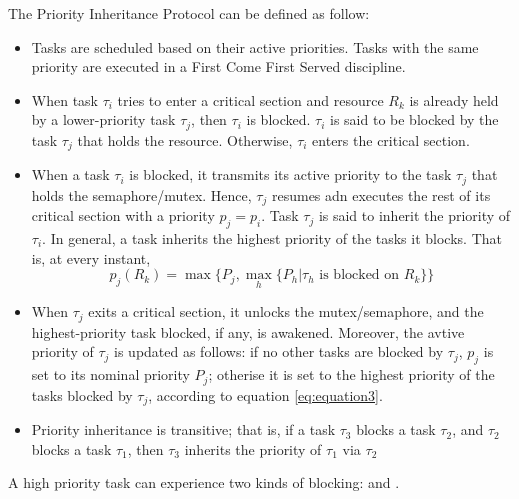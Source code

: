 The Priority Inheritance Protocol can be defined as follow:
\begin{itemize}
    \item Tasks are scheduled based on their active priorities. Tasks with the same priority are executed in a First Come First Served discipline.
    \item When task $\tau_i$ tries to enter a critical section and resource $R_k$ is already held by a lower-priority task $\tau_j$, then $\tau_i$ is blocked. $\tau_i$ is said to be blocked by the task $\tau_j$ that holds the resource. Otherwise, $\tau_i$ enters the critical section.
    \item When a task $\tau_i$ is blocked, it transmits its active priority to the task $\tau_j$ that holds the semaphore/mutex. Hence, $\tau_j$ resumes adn executes the rest of its critical section with a priority $p_j = p_i$. Task $\tau_j$ is said to inherit the priority of $\tau_i$. In general, a task inherits the highest priority of the tasks it blocks. That is, at every instant,
    \begin{equation}
        \label{eq:equation3}
        p_j(R_k) = \max \{P_j, \max_h \{P_h | \tau_h \text{ is blocked on }R_k\}\}
    \end{equation}
    \item When $\tau_j$ exits a critical section, it unlocks the mutex/semaphore, and the highest-priority task blocked, if any, is awakened. Moreover, the avtive priority of $\tau_j$ is updated as follows: if no other tasks are blocked by $\tau_j$, $p_j$ is set to its nominal priority $P_j$; otherise it is set to the highest priority of the tasks blocked by $\tau_j$, according to equation \ref{eq:equation3}.
    \item Priority inheritance is transitive; that is, if a task $\tau_3$ blocks a task $\tau_2$, and $\tau_2$ blocks a task $\tau_1$, then $\tau_3$ inherits the priority of $\tau_1$ via $\tau_2$
\end{itemize}

A high priority task can experience two kinds of blocking:  and .



